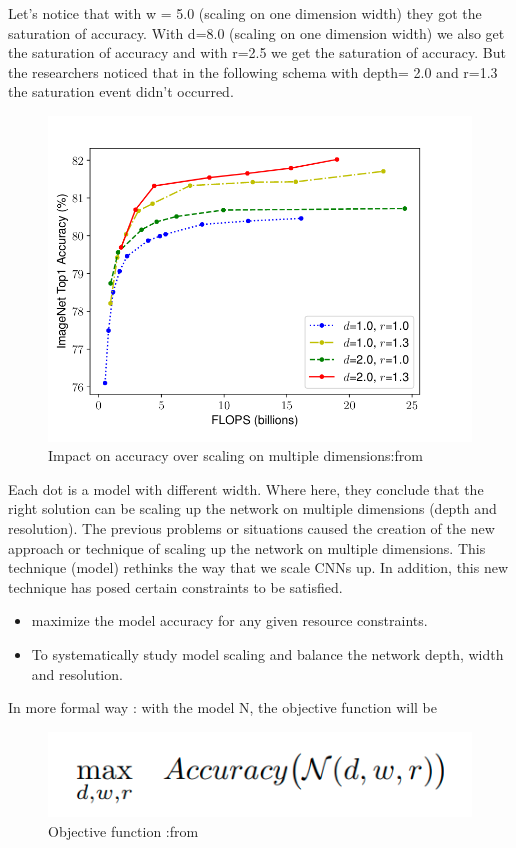 \documentclass[a4paper]{article}
\begin{document}
Let’s notice that with w = 5.0 (scaling on one dimension width) they got the saturation of accuracy. With d=8.0 (scaling on one dimension width) we also get the saturation of accuracy and with r=2.5  we get the saturation of accuracy. 
But the researchers noticed that in the following schema with depth= 2.0 and r=1.3 the saturation event didn't occurred. 

    \begin{figure}[H]
      \includegraphics[width=\linewidth]{images/efficeint.png}
      \caption{Impact on accuracy over scaling on multiple dimensions:from \cite{DBLP:journals/corr/abs-1905-11946}}
      \label{fig:scaling_multi}
    \end{figure}
    
Each dot is a model with different width. Where here, they conclude that the right solution can be scaling up the network on multiple dimensions (depth and resolution).
The previous problems or situations caused the creation of the new approach or technique of scaling up the network on multiple dimensions. 
This technique (model) rethinks the way that we scale CNNs up. In addition, this new technique has posed certain constraints to be satisfied. 
\begin{itemize}
    \item {maximize the model accuracy for any given resource constraints. }
    \item { To systematically study model scaling and balance the network depth, width and resolution.}
\end{itemize}

In more formal way : with the model N, the objective function will be
       \begin{figure}[H]
      \includegraphics[scale=0.25]{images/accurat.png}
      \caption{Objective function :from \cite{DBLP:journals/corr/abs-1905-11946}}
      \label{fig:scaling_multi}
    \end{figure}
    
\end{document}
